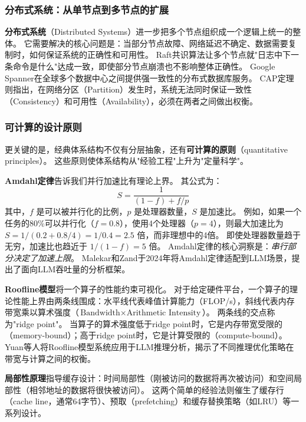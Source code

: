 \subsubsection{分布式系统：从单节点到多节点的扩展}

\textbf{分布式系统}（Distributed Systems）进一步把多个节点组织成一个逻辑上统一的整体。
它需要解决的核心问题是：当部分节点故障、网络延迟不确定、数据需要复制时，如何保证系统的正确性和可用性\cite{cap2002}。
Raft共识算法\cite{raft2014}让多个节点就"日志中下一条命令是什么"达成一致，即使部分节点崩溃也不影响整体正确性。
Google Spanner\cite{spanner2012}在全球多个数据中心之间提供强一致性的分布式数据库服务。
CAP定理\cite{cap2002}则指出，在网络分区（Partition）发生时，系统无法同时保证一致性（Consistency）和可用性（Availability），必须在两者之间做出权衡。

\subsubsection{可计算的设计原则}

更关键的是，经典体系结构不仅有分层抽象，还有\textbf{可计算的原则}（quantitative principles）。
这些原则使体系结构从"经验工程"上升为"定量科学"。

\textbf{Amdahl定律}告诉我们并行加速比有理论上界。
其公式为：
\begin{equation}
\label{eq:amdahl}
S = \frac{1}{(1-f) + f/p}
\end{equation}
其中，$f$ 是可以被并行化的比例，$p$ 是处理器数量，$S$ 是加速比。
例如，如果一个任务的80\%可以并行化（$f=0.8$），使用4个处理器（$p=4$），则最大加速比为 $S = 1/(0.2 + 0.8/4) = 1/0.4 = 2.5$ 倍，而非理想中的4倍。
即使处理器数量趋于无穷，加速比也趋近于 $1/(1-f) = 5$ 倍。
Amdahl定律的核心洞察是：\emph{串行部分决定了加速上限}。
Malekar和Zand于2024年将Amdahl定律适配到LLM场景，提出了面向LLM吞吐量的分析框架\cite{malekar2024amdahlllm}。

\textbf{Roofline模型}将一个算子的性能约束可视化\cite{hennessy2017quantitative}。
对于给定硬件平台，一个算子的理论性能上界由两条线围成：水平线代表峰值计算能力（FLOP/s），斜线代表内存带宽乘以算术强度（$\text{Bandwidth} \times \text{Arithmetic Intensity}$）。
两条线的交点称为"ridge point"。
当算子的算术强度低于ridge point时，它是内存带宽受限的（memory-bound）；高于ridge point时，它是计算受限的（compute-bound）。
Yuan等人将Roofline模型系统应用于LLM推理分析，揭示了不同推理优化策略在带宽与计算之间的权衡\cite{yuan2024llminference}。

\textbf{局部性原理}指导缓存设计：时间局部性（刚被访问的数据将再次被访问）和空间局部性（相邻地址的数据将很快被访问）\cite{drepper2007memory}。
这两个简单的经验法则催生了缓存行（cache line，通常64字节）、预取（prefetching）和缓存替换策略（如LRU）等一系列设计。

